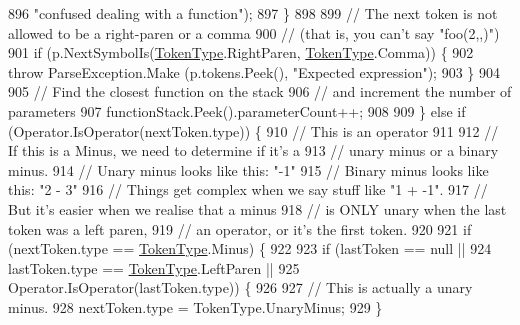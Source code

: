\begin{DoxyCode}
896                                 \textcolor{stringliteral}{"confused dealing with a function"});
897                         \}
898 
899                         \textcolor{comment}{// The next token is not allowed to be a right-paren or a comma}
900                         \textcolor{comment}{// (that is, you can't say "foo(2,,)")}
901                         \textcolor{keywordflow}{if} (p.NextSymbolIs(\hyperlink{a00031_a301aa7c866593a5b625a8fc158bbeace}{TokenType}.RightParen, 
      \hyperlink{a00031_a301aa7c866593a5b625a8fc158bbeace}{TokenType}.Comma)) \{
902                             \textcolor{keywordflow}{throw} ParseException.Make (p.tokens.Peek(), \textcolor{stringliteral}{"Expected expression"});
903                         \}
904 
905                         \textcolor{comment}{// Find the closest function on the stack}
906                         \textcolor{comment}{// and increment the number of parameters}
907                         functionStack.Peek().parameterCount++;
908 
909                     \} \textcolor{keywordflow}{else} \textcolor{keywordflow}{if} (Operator.IsOperator(nextToken.type)) \{
910                         \textcolor{comment}{// This is an operator}
911 
912                         \textcolor{comment}{// If this is a Minus, we need to determine if it's a }
913                         \textcolor{comment}{// unary minus or a binary minus.}
914                         \textcolor{comment}{// Unary minus looks like this: "-1"}
915                         \textcolor{comment}{// Binary minus looks like this: "2 - 3"}
916                         \textcolor{comment}{// Things get complex when we say stuff like "1 + -1".}
917                         \textcolor{comment}{// But it's easier when we realise that a minus}
918                         \textcolor{comment}{// is ONLY unary when the last token was a left paren,}
919                         \textcolor{comment}{// an operator, or it's the first token.}
920 
921                         \textcolor{keywordflow}{if} (nextToken.type == \hyperlink{a00031_a301aa7c866593a5b625a8fc158bbeace}{TokenType}.Minus) \{
922 
923                             \textcolor{keywordflow}{if} (lastToken == null || 
924                                 lastToken.type == \hyperlink{a00031_a301aa7c866593a5b625a8fc158bbeace}{TokenType}.LeftParen ||
925                                 Operator.IsOperator(lastToken.type)) \{
926 
927                                 \textcolor{comment}{// This is actually a unary minus.}
928                                 nextToken.type = TokenType.UnaryMinus;
929                             \}

\end{DoxyCode}
